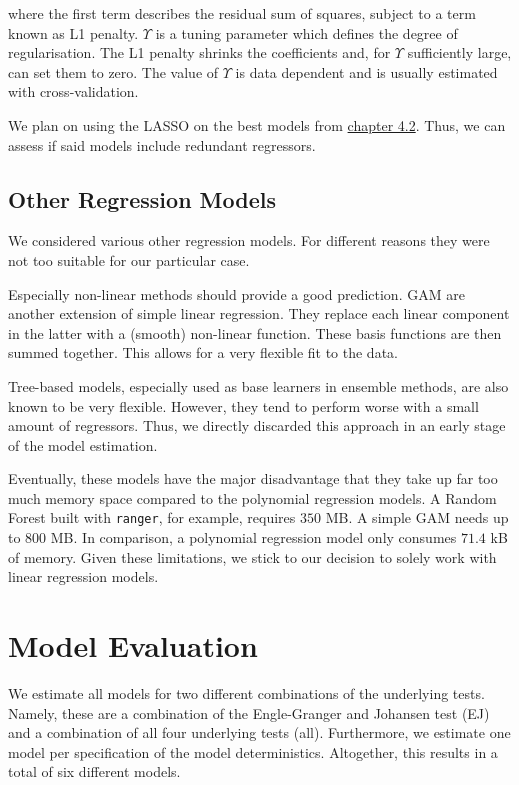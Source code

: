 \documentclass[12pt,a4paper]{article}
\begin{document}
where the first term describes the residual sum of squares, subject to a
term known as L1 penalty. \(\Upsilon\) is a tuning parameter which
defines the degree of regularisation. The L1 penalty shrinks the
coefficients and, for \(\Upsilon\) sufficiently large, can set them to
zero. The value of \(\Upsilon\) is data dependent and is usually
estimated with cross-validation. \autocite{James_2013}

We plan on using the \ac{LASSO} on the best models from
\protect\hyperlink{polynomial-regression}{chapter 4.2}. Thus, we can
assess if said models include redundant regressors.

\hypertarget{other-regression-models}{%
\subsection{Other Regression Models}\label{other-regression-models}}

We considered various other regression models. For different reasons
they were not too suitable for our particular case.

Especially non-linear methods should provide a good prediction. \ac{GAM}
are another extension of simple linear regression. They replace each
linear component in the latter with a (smooth) non-linear function.
These basis functions are then summed together. This allows for a very
flexible fit to the data. \autocite{James_2013}

Tree-based models, especially used as base learners in ensemble methods,
are also known to be very flexible. However, they tend to perform worse
with a small amount of regressors. Thus, we directly discarded this
approach in an early stage of the model estimation.

Eventually, these models have the major disadvantage that they take up
far too much memory space compared to the polynomial regression models.
A Random Forest built with \texttt{ranger}, for example, requires
\(350\) MB. A simple GAM needs up to \(800\) MB. In comparison, a
polynomial regression model only consumes \(71.4\) kB of memory. Given
these limitations, we stick to our decision to solely work with linear
regression models.

\hypertarget{model-evaluation}{%
\section{Model Evaluation}\label{model-evaluation}}

We estimate all models for two different combinations of the underlying
tests. Namely, these are a combination of the Engle-Granger and Johansen
test (EJ) and a combination of all four underlying tests (all).
Furthermore, we estimate one model per specification of the model
deterministics. Altogether, this results in a total of six different
models.
\end{document}
